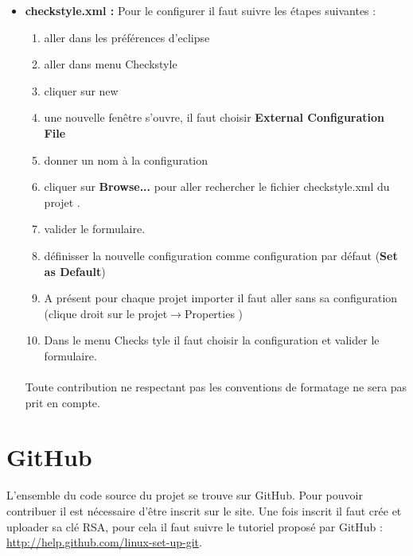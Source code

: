 \begin{itemize}
	\item  \textbf{checkstyle.xml :}
		Pour le configurer il faut suivre les étapes suivantes :
		\begin{enumerate}
				\item aller dans les préférences d'eclipse
				\item aller dans menu Checkstyle
				\item cliquer sur new
				\item une nouvelle fenêtre s'ouvre, il faut choisir \textbf{External Configuration File}
				\item donner un nom à la configuration
				\item cliquer sur \textbf{Browse...} pour aller rechercher le fichier checkstyle.xml du projet \youTestIt{}.
				\item valider le formulaire.
				\item définisser la nouvelle configuration comme configuration par défaut (\textbf{Set as Default})
				\item A présent pour chaque projet importer il faut aller sans sa configuration 
							(clique droit sur le projet$\rightarrow$Properties )
				\item Dans le menu Checks	tyle il faut choisir la configuration  \youTestIt{} et valider le formulaire.
		\end{enumerate}
	

	\paragraph{}	
	
	\begin{attention}
		Toute contribution ne respectant pas les conventions de formatage ne sera pas prit en compte.
	\end{attention}
	
\end{itemize}
\section{GitHub}
L'ensemble du code source du projet se trouve sur GitHub. Pour pouvoir contribuer il est
nécessaire d’être inscrit sur le site.  Une fois inscrit il faut crée et uploader sa clé RSA, pour cela il faut suivre le tutoriel proposé 
par GitHub : \href{http://help.github.com/linux-set-up-git/ }{http://help.github.com/linux-set-up-git}. 

